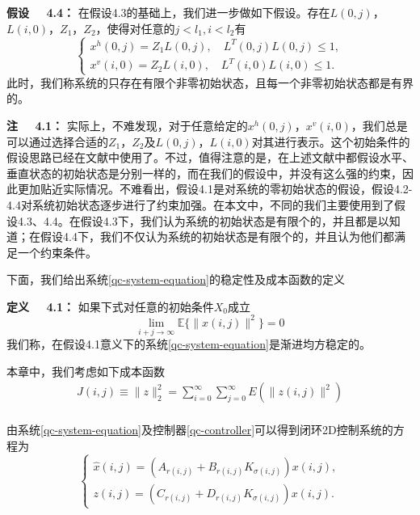 	{\bf 假设 \ \ 4.4：}
	在假设4.3的基础上，我们进一步做如下假设。存在$L(0,j)$，$L(i,0)$，$Z_1$，$Z_2$，使得对任意的$j<l_1,i<l_2$有
	\begin{equation}
		\left\{
		\begin{array}{lr}
		x^{h}(0,j)=Z_1L(0,j),\quad L^{T}(0,j)L(0,j)\leq 1,\\
		x^{v}(i,0)=Z_2L(i,0),\quad  L^{T}(i,0)L(i,0)\leq 1.
		\end{array}
		\right.
	\end{equation}
	此时，我们称系统的只存在有限个非零初始状态，且每一个非零初始状态都是有界的。
	
	{\bf 注 \ \ 4.1：}
	实际上，不难发现，对于任意给定的$x^{h}(0,j)$，$x^{v}(i,0)$，我们总是可以通过选择合适的$Z_1$，$Z_2$及$L(0,j)$，$L(i,0)$对其进行表示。这个初始条件的假设思路已经在文献\cite{guan2001robust,dhawan2007optimal,dhawan2010lmi}中使用了。不过，值得注意的是，在上述文献中都假设水平、垂直状态的初始状态是分别一样的，而在我们的假设中，并没有这么强的约束，因此更加贴近实际情况。不难看出，假设4.1是对系统的零初始状态的假设，假设4.2-4.4对系统初始状态逐步进行了约束加强。在本文中，不同的我们主要使用到了假设4.3、4.4。在假设4.3下，我们认为系统的初始状态是有限个的，并且都是以知道；在假设4.4下，我们不仅认为系统的初始状态是有限个的，并且认为他们都满足一个约束条件。
	
	下面，我们给出系统\eqref{qc-system-equation}的稳定性及成本函数的定义
	
	{\bf 定义 \ \ 4.1：}
	如果下式对任意的初始条件$X_{0}$成立
	\begin{equation}\label{qc-AMSS}
	\lim\limits_{i+j\to\infty}\mathbb{E}\{\|x(i,j)\|^{2}\} = 0
	\end{equation}
	我们称，在假设4.1意义下的系统\eqref{qc-system-equation}是渐进均方稳定的。
	
	本章中，我们考虑如下成本函数
	\begin{equation}\label{qccostfuntion}
	\begin{split}
	J(i,j) \equiv \|z\|_{2}^{2} = \sum_{i=0}^{\infty}\sum_{j=0}^{\infty}E(\|z(i,j)\|^{2})\\
	\end{split}
	\end{equation}
	
	由系统\eqref{qc-system-equation}及控制器\eqref{qc-controller}可以得到闭环2D控制系统的方程为
	\begin{equation}\label{qc-closed-system-equation}
		\left\{
			\begin{array}{lr}
				\hat{x}(i,j) = (A_{r(i,j)}+B_{r(i,j)}K_{\sigma(i,j)})x(i,j), \\
				z(i,j) = (C_{r(i,j)}+D_{r(i,j)}K_{\sigma(i,j)})x(i,j).
			\end{array}
		\right.
	\end{equation}
	

